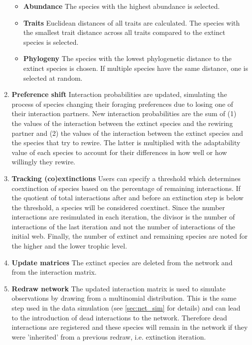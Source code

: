 \documentclass[12pt,a4paper]{article}
\begin{document}
\begin{enumerate}
\begin{itemize}
		\item \label{itm:abund_rew} \textbf{Abundance} {\small The species with the highest abundance is selected.}
		\item \label{itm:trait_rew} \textbf{Traits} {\small Euclidean distances of all traits are calculated. The species with the smallest trait distance across all traits compared to the extinct species is selected.}
		\item \label{itm:phylo_rew} \textbf{Phylogeny} {\small The species with the lowest phylogenetic distance to the extinct species is chosen. If multiple species have the same distance, one is selected at random.}
		\end{itemize}
	\item \label{itm:shift} \textbf{Preference shift} {\small Interaction probabilities are updated, simulating the process of species changing their foraging preferences due to losing one of their interaction partners. New interaction probabilities are the sum of (1) the values of the interaction between the extinct species and the rewiring partner and (2) the values of the interaction between the extinct species and the species that try to rewire. The latter is multiplied with the adaptability value of each species to account for their differences in how well or how willingly they rewire.}
	\item  \label{itm:track} \textbf{Tracking (co)extinctions} {\small Users can specify a threshold which determines coextinction of species based on the percentage of remaining interactions. If the quotient of total interactions after and before an extinction step is below the threshold, a species will be considered coextinct. Since the number interactions are resimulated in each iteration, the divisor is the number of interactions of the last iteration and not the number of interactions of the initial web. Finally, the number of extinct and remaining species are noted for the higher and the lower trophic level.}
	\item \label{itm:update} \textbf{Update matrices} {\small The extinct species are deleted from the network and from the interaction matrix.}
	\item \label{itm:redraw} \textbf{Redraw network} {\small The updated interaction matrix is used to simulate observations by drawing from a multinomial distribution. This is the same step used in the data simulation (see \ref{sec:net_sim} for details) and can lead to the introduction of dead interactions to the network. Therefore dead interactions are registered and these species will remain in the network if they were 'inherited' from a previous redraw, i.e. extinction iteration.}
	\end{enumerate}
\end{document}
